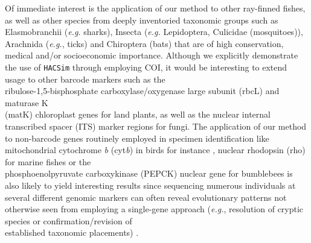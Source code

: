 Of immediate interest is the application of our method to other ray-finned fishes, as well as other species from deeply inventoried taxonomic groups such as Elasmobranchii (\textit{e.g.} sharks), Insecta (\textit{e.g.} Lepidoptera, Culicidae (mosquitoes)), Arachnida (\textit{e.g.}, ticks) and Chiroptera (bats) that are of high conservation, medical and/or socioeconomic importance. Although we explicitly demonstrate the use of {\tt HACSim} through employing COI, it would be interesting to extend usage to other barcode markers such as the \\ ribulose-1,5-bisphosphate carboxylase/oxygenase large subunit (rbcL) and maturase K \\ (matK) chloroplast genes for land plants, as well as the nuclear internal transcribed spacer (ITS) marker regions for fungi. The application of our method to non-barcode genes routinely employed in specimen identification like mitochondrial cytochrome \textit{b} (cyt\textit{b}) in birds for instance \cite{baker2009countering, lavinia2016calibrating}, nuclear rhodopsin (rho) for marine fishes \cite{hanner2011dna} or the \\ phosphoenolpyruvate carboxykinase (PEPCK) nuclear gene for bumblebees \cite{williams2015genes} is also likely to yield interesting results since sequencing numerous individuals at several different genomic markers can often reveal evolutionary patterns not otherwise seen from employing a single-gene approach (\textit{e.g.}, resolution of cryptic species or confirmation/revision of \\ established taxonomic placements) \cite{williams2015genes}. 



